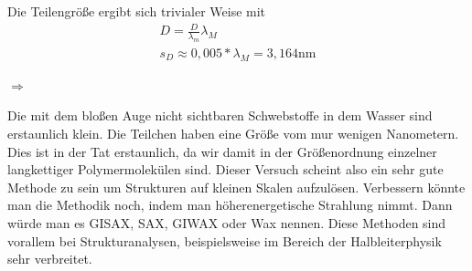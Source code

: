 Die Teilengröße ergibt sich trivialer Weise mit 
\begin{gather*}
    D = \frac{D}{\lambda_m}\lambda_M\\
    s_D \approx 0,005*\lambda_M = 3,164\mathrm{nm}
\end{gather*}
\begin{center}
    \centering
    $\Rightarrow$ 
\end{center}
Die mit dem bloßen Auge nicht sichtbaren Schwebstoffe in dem Wasser sind erstaunlich klein. Die Teilchen haben eine Größe vom mur wenigen Nanometern. 
Dies ist in der Tat erstaunlich, da wir damit in der Größenordnung einzelner langkettiger Polymermolekülen sind. Dieser Versuch scheint also ein sehr gute Methode zu sein um 
Strukturen auf kleinen Skalen aufzulösen. Verbessern könnte man die Methodik noch, indem man höherenergetische Strahlung nimmt. Dann würde man es GISAX, SAX, GIWAX oder Wax nennen. Diese Methoden 
sind vorallem bei Strukturanalysen, beispielsweise im Bereich der Halbleiterphysik sehr verbreitet.